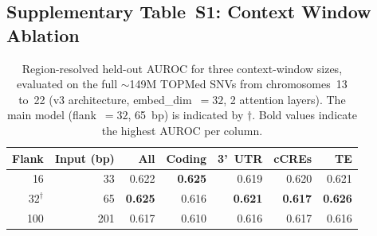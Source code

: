\documentclass[unnumsec,webpdf,contemporary,large]{oup-authoring-template}%
\newcommand{\rev}[1]{{\color{red}#1}}
\theoremstyle{thmstyleone}%
\theoremstyle{thmstyletwo}%
\theoremstyle{thmstylethree}%
\begin{document}
\subsection*{Supplementary Table~S1: Context Window Ablation}

\begin{table}[h!]
\centering
\small
\caption{\rev{Region-resolved held-out AUROC for three context-window sizes, evaluated on the full ${\sim}$149M TOPMed SNVs from chromosomes~13 to~22 (v3 architecture, embed\_dim~$= 32$, 2 attention layers). The main model (flank~$= 32$, 65~bp) is indicated by $\dagger$. Bold values indicate the highest AUROC per column.}}
\label{tab:flank_ablation}
\begin{tabular}{rrrrrrr}
\hline
\textbf{Flank} & \textbf{Input (bp)} & \textbf{All} & \textbf{Coding} & \textbf{3'~UTR} & \textbf{cCREs} & \textbf{TE} \\
\hline
16  & 33  & 0.622 & \textbf{0.625} & 0.619 & 0.620 & 0.621 \\
$32^{\dagger}$ & 65 & \textbf{0.625} & 0.616 & \textbf{0.621} & \textbf{0.617} & \textbf{0.626} \\
100 & 201 & 0.617 & 0.610 & 0.616 & 0.617 & 0.616 \\
\hline
\end{tabular}
\end{table}
\end{document}
